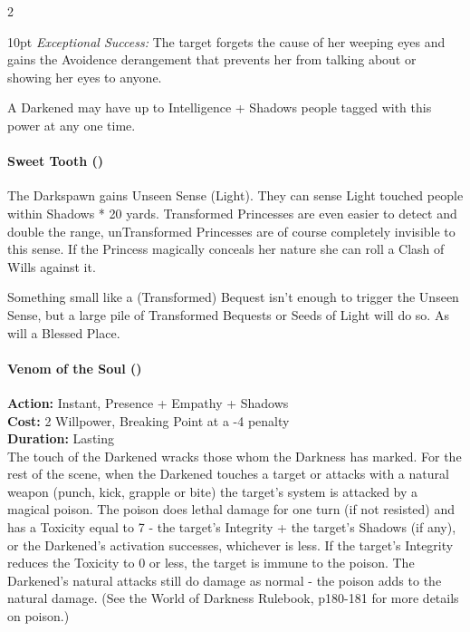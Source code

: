 \begin{multicols}{2}
\begin{myindentpar}{10pt}
    \emph{Exceptional Success:} The target forgets the cause of her weeping eyes and gains the Avoidence derangement that prevents her from talking about or showing her eyes to anyone.\end{myindentpar}

\noindent A Darkened may have up to Intelligence + Shadows people tagged with this power at any one time.\\


\paragraph*{Sweet Tooth (\textbullet)}

The Darkspawn gains Unseen Sense (Light). They can sense Light touched people within Shadows * 20 yards. Transformed Princesses are even easier to detect and double the range, unTransformed Princesses are of course completely invisible to this sense. If the Princess magically conceals her nature she can roll a Clash of Wills against it. 

Something small like a (Transformed) Bequest isn't enough to trigger the Unseen Sense, but a large pile of Transformed Bequests or Seeds of Light will do so. As will a Blessed Place. 

\paragraph*{Venom of the Soul (\textbullet\textbullet\textbullet\textbullet\textbullet)}

\noindent \textbf{Action:} Instant, Presence + Empathy + Shadows\\

\noindent \textbf{Cost:} 2 Willpower, Breaking Point at a -4 penalty\\

\noindent \textbf{Duration:} Lasting \\

\noindent The touch of the Darkened wracks those whom the Darkness has marked. For the rest of the scene, when the Darkened touches a target or attacks with a natural weapon (punch, kick, grapple or bite) the target's system is attacked by a magical poison. The poison does lethal damage for one turn (if not resisted) and has a Toxicity equal to 7 - the target's Integrity + the target's Shadows (if any), or the Darkened's activation successes, whichever is less. If the target's Integrity reduces the Toxicity to 0 or less, the target is immune to the poison. The Darkened's natural attacks still do damage as normal - the poison adds to the natural damage. (See the World of Darkness Rulebook, p180-181 for more details on poison.)


\end{multicols}
